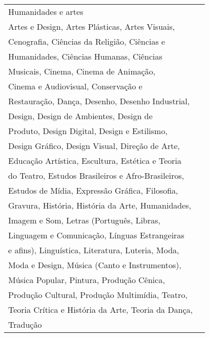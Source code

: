\begin{longtable}[c]{ll}
    Humanidades e artes                                                             & \begin{tabular}[c]{@{}l@{}}Animação, Arqueologia, Artes, Artes Cênicas, \\ Artes e Design, Artes Plásticas, Artes Visuais, \\ Cenografia, Ciências da Religião, Ciências e \\ Humanidades, Ciências Humanas, Ciências \\ Musicais, Cinema, Cinema de Animação, \\ Cinema e Audiovisual, Conservação e \\ Restauração, Dança, Desenho, Desenho Industrial, \\ Design, Design de Ambientes, Design de \\ Produto, Design Digital, Design e Estilismo, \\ Design Gráfico, Design Visual, Direção de Arte, \\ Educação Artística, Escultura, Estética e Teoria \\ do Teatro, Estudos Brasileiros e Afro-Brasileiros, \\ Estudos de Mídia, Expressão Gráfica, Filosofia, \\ Gravura, História, História  da Arte, Humanidades, \\ Imagem e Som, Letras (Português, Libras, \\ Linguagem e Comunicação, Línguas Estrangeiras \\ e afins), Linguística, Literatura, Luteria, Moda, \\ Moda e Design, Música (Canto e Instrumentos), \\ Música Popular, Pintura, Produção Cênica, \\ Produção Cultural, Produção  Multimídia, Teatro,\\ Teoria Crítica e História da Arte, Teoria da Dança,\\ Tradução\end{tabular}                                                                                                                                                                                                                                                                                                                                                                                                                                                                                                                                                                                                                                                                                             \\ \hline

\end{longtable}
